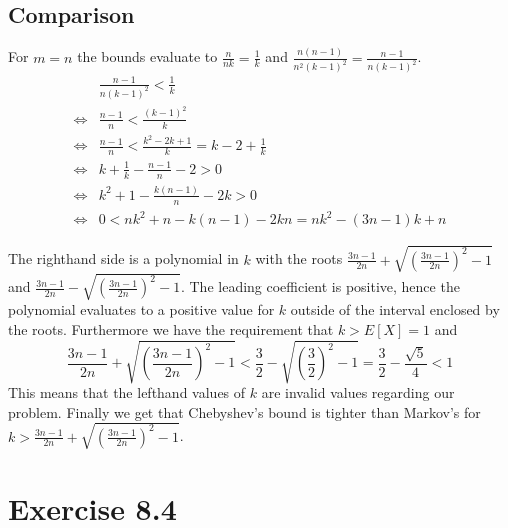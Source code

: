 \documentclass[10pt,a4paper]{article}
\begin{document}
\subsection*{Comparison}

For $m = n$ the bounds evaluate to $\frac{n}{nk} = \frac{1}{k}$ and $\frac{n(n - 1)}{n^{2}(k - 1)^{2}} = \frac{n - 1}{n(k - 1)^{2}}$.
\begin{align*}
  & \frac{n - 1}{n(k - 1)^{2}} < \frac{1}{k}\\
  \Leftrightarrow & \frac{n - 1}{n} < \frac{(k - 1)^{2}}{k}\\
  \Leftrightarrow & \frac{n - 1}{n} < \frac{k^{2} - 2k + 1}{k} = k - 2 + \frac{1}{k}\\
  \Leftrightarrow & k + \frac{1}{k} - \frac{n - 1}{n} - 2 > 0\\
  \Leftrightarrow & k^{2} + 1 - \frac{k(n - 1)}{n} - 2k > 0\\
  \Leftrightarrow & 0 < nk^{2} + n - k(n - 1) - 2kn = nk^{2} - (3n - 1)k + n
\end{align*}

The righthand side is a polynomial in $k$ with the roots $\frac{3n - 1}{2n} + \sqrt{\left( \frac{3n - 1}{2n} \right)^{2} - 1}$ and $\frac{3n - 1}{2n} - \sqrt{\left( \frac{3n - 1}{2n} \right)^{2} - 1}$.
The leading coefficient is positive, hence the polynomial evaluates to a positive value for $k$ outside of the interval enclosed by the roots.
Furthermore we have the requirement that $k > E[X] = 1$ and
\begin{equation*}
  \frac{3n - 1}{2n} + \sqrt{\left( \frac{3n - 1}{2n} \right)^{2} - 1} < \frac{3}{2} - \sqrt{\left( \frac{3}{2} \right)^{2} - 1} = \frac{3}{2} - \frac{\sqrt{5}}{4} < 1
\end{equation*}
This means that the lefthand values of $k$ are invalid values regarding our problem.
Finally we get that Chebyshev's bound is tighter than Markov's for $k > \frac{3n - 1}{2n} + \sqrt{\left( \frac{3n - 1}{2n} \right)^{2} - 1}$.

\section*{Exercise 8.4}
\end{document}
